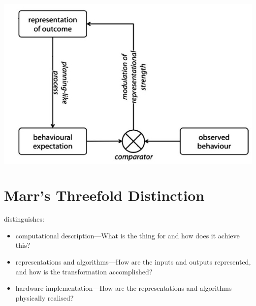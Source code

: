 \documentclass[12pt]{extarticle}
\begin{document}
\begin{multicols*}{3}
 
\begin{center}

  \includegraphics[scale=0.32]{fig/motor_theory.jpg}
  
  \end{center}

\section{Marr’s Threefold Distinction}
 
\citet[p.~22ff]{Marr:1982kx} distinguishes:
 
\begin{itemize}
 
\item computational description---What is the thing for and how does it achieve this?
 
\item representations and algorithms---How are the inputs and outputs represented, and how is the transformation accomplished?
 
\item hardware implementation---How are the representations and algorithms physically realised?
 
\end{itemize}



\vfill



\footnotesize


\end{multicols*}
\end{document}
